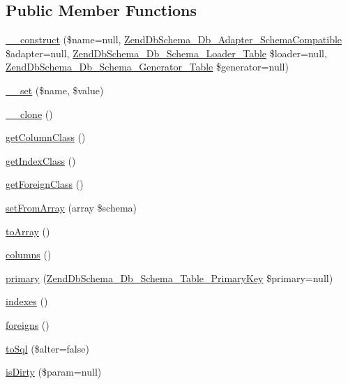\subsection*{Public Member Functions}
\begin{DoxyCompactItemize}
\item 
\hyperlink{classZendDbSchema__Db__Schema__Table_a6cd2e671ba94a27051600589dceca7b9}{\-\_\-\-\_\-construct} (\$name=null, \hyperlink{interfaceZendDbSchema__Db__Adapter__SchemaCompatible}{Zend\-Db\-Schema\-\_\-\-Db\-\_\-\-Adapter\-\_\-\-Schema\-Compatible} \$adapter=null, \hyperlink{interfaceZendDbSchema__Db__Schema__Loader__Table}{Zend\-Db\-Schema\-\_\-\-Db\-\_\-\-Schema\-\_\-\-Loader\-\_\-\-Table} \$loader=null, \hyperlink{interfaceZendDbSchema__Db__Schema__Generator__Table}{Zend\-Db\-Schema\-\_\-\-Db\-\_\-\-Schema\-\_\-\-Generator\-\_\-\-Table} \$generator=null)
\item 
\hyperlink{classZendDbSchema__Db__Schema__Table_aca1c83f883007a2210ea4f470804d4d1}{\-\_\-\-\_\-set} (\$name, \$value)
\item 
\hyperlink{classZendDbSchema__Db__Schema__Table_a1fcef515c845c7770e17f997f80cafa9}{\-\_\-\-\_\-clone} ()
\item 
\hyperlink{classZendDbSchema__Db__Schema__Table_aa8f73f3bacc676e82bb6dfe48c6e2536}{get\-Column\-Class} ()
\item 
\hyperlink{classZendDbSchema__Db__Schema__Table_ab7555e58d0f181e37f3cf57861b60286}{get\-Index\-Class} ()
\item 
\hyperlink{classZendDbSchema__Db__Schema__Table_afe67cc2f947c8aecf9eddf01cd8f8384}{get\-Foreign\-Class} ()
\item 
\hyperlink{classZendDbSchema__Db__Schema__Table_abeba5309be6269e72b2818fcabc01fec}{set\-From\-Array} (array \$schema)
\item 
\hyperlink{classZendDbSchema__Db__Schema__Table_aad47d08cebd042ad8e64d825b65859ab}{to\-Array} ()
\item 
\hyperlink{classZendDbSchema__Db__Schema__Table_a214354faa96de67a26b787c2c8741850}{columns} ()
\item 
\hyperlink{classZendDbSchema__Db__Schema__Table_a9d445dd6a92cc3a50aa6d8dad8395f0a}{primary} (\hyperlink{classZendDbSchema__Db__Schema__Table__PrimaryKey}{Zend\-Db\-Schema\-\_\-\-Db\-\_\-\-Schema\-\_\-\-Table\-\_\-\-Primary\-Key} \$primary=null)
\item 
\hyperlink{classZendDbSchema__Db__Schema__Table_a47df29d95af8f655dd7506cfb649ec40}{indexes} ()
\item 
\hyperlink{classZendDbSchema__Db__Schema__Table_acff371c2884c9688b5ede2deaf09f25c}{foreigns} ()
\item 
\hyperlink{classZendDbSchema__Db__Schema__Table_a6178edaeea7e08d97e2196dd991532f9}{to\-Sql} (\$alter=false)
\item 
\hyperlink{classZendDbSchema__Db__Schema__Table_a21a2a75870207a989576655fec7507c3}{is\-Dirty} (\$param=null)
\end{DoxyCompactItemize}
